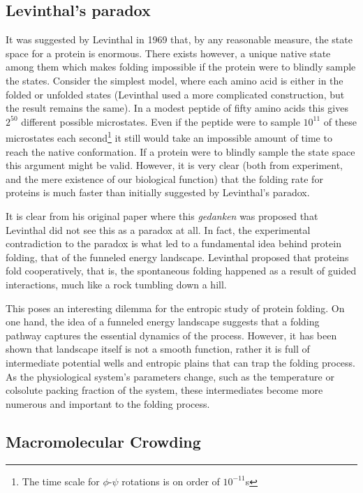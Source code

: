 \subsection{Levinthal's paradox}

It was suggested by Levinthal in 1969 that, by any reasonable measure, the state space for a protein is enormous. There exists however, a unique native state among them which makes folding impossible if the protein were to blindly sample the states.\cite{levinthal_are_1968} Consider the simplest model, where each amino acid is either in the folded or unfolded states (Levinthal used a more complicated construction, but the result remains the same). In a modest peptide of fifty amino acids this gives $2^{50}$ different possible microstates. Even if the peptide were to sample $10^{11}$ of these microstates each second\footnote{The time scale for $\phi$-$\psi$ rotations is on order of $10^{-11}$s} it still would take an impossible amount of time to reach the native conformation. If a protein were to blindly sample the state space this argument might be valid. However, it is very clear (both from experiment, and the mere existence of our biological function) that the folding rate for proteins is much faster than initially suggested by Levinthal's paradox.

It is clear from his original paper where this \textit{gedanken} was proposed that Levinthal did not see this as a paradox at all. In fact, the experimental contradiction to the paradox is what led to a fundamental idea behind protein folding, that of the funneled energy landscape. Levinthal proposed that proteins fold cooperatively, that is, the spontaneous folding happened as a result of guided interactions, much like a rock tumbling down a hill. 

This poses an interesting dilemma for the entropic study of protein folding. On one hand, the idea of a funneled energy landscape suggests that a folding pathway captures the essential dynamics of the process. However, it has been shown that landscape itself is not a smooth function, rather it is full of intermediate potential wells and entropic plains that can trap the folding process. As the physiological system's parameters change, such as the temperature or colsolute packing fraction of the system, these intermediates become more numerous and important to the folding process.

\subsection{Macromolecular Crowding}

